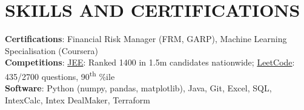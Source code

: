 

\section{SKILLS AND CERTIFICATIONS}
 \begin{itemize}[leftmargin=0.00in, label={}]
    \small{\item{
    \textbf{Certifications}{: Financial Risk Manager (FRM, GARP), Machine Learning Specialisation (Coursera)} \\
     \textbf{Competitions}{: \uline{JEE}: Ranked 1400 in 1.5m candidates nationwide; \uline{LeetCode}: 435/2700 questions, 90\textsuperscript{th} \%ile\\
     \textbf{Software}{: Python (numpy, pandas, matplotlib), Java, Git, Excel, SQL, IntexCalc, Intex DealMaker, Terraform}
     }\\

    }}
 \end{itemize}
 \vspace{-16pt}

